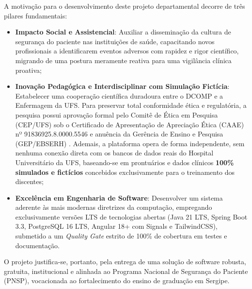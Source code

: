 A motivação para o desenvolvimento deste projeto departamental decorre de três pilares fundamentais:
\begin{itemize}
    \item \textbf{Impacto Social e Assistencial}: Auxiliar a disseminação da cultura de segurança do paciente nas instituições de saúde, capacitando novos profissionais a identificarem eventos adversos com rapidez e rigor científico, migrando de uma postura meramente reativa para uma vigilância clínica proativa;
    \item \textbf{Inovação Pedagógica e Interdisciplinar com Simulação Fictícia}: Estabelecer uma cooperação científica duradoura entre o DCOMP e a Enfermagem da UFS. Para preservar total conformidade ética e regulatória, a pesquisa possui aprovação formal pelo Comitê de Ética em Pesquisa (CEP/UFS) sob o Certificado de Apresentação de Apreciação Ética (CAAE) nº 91836925.8.0000.5546 e anuência da Gerência de Ensino e Pesquisa (GEP/EBSERH) \cite{cep_ufs2025}. Ademais, a plataforma opera de forma independente, sem nenhuma conexão direta com os bancos de dados reais do Hospital Universitário da UFS, baseando-se em prontuários e dados clínicos \textbf{100\% simulados e fictícios} concebidos exclusivamente para o treinamento dos discentes;
    \item \textbf{Excelência em Engenharia de Software}: Desenvolver um sistema aderente às mais modernas diretrizes da computação, empregando exclusivamente versões LTS de tecnologias abertas (Java 21 LTS, Spring Boot 3.3, PostgreSQL 16 LTS, Angular 18+ com Signals e TailwindCSS), submetido a um \textit{Quality Gate} estrito de 100\% de cobertura em testes e documentação.
\end{itemize}

O projeto justifica-se, portanto, pela entrega de uma solução de software robusta, gratuita, institucional e alinhada ao Programa Nacional de Segurança do Paciente (PNSP), vocacionada ao fortalecimento do ensino de graduação em Sergipe.
